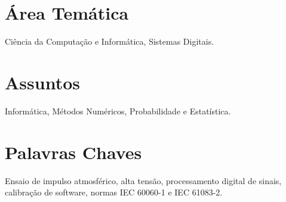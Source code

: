 \section*{Área Temática}
Ciência da Computação e Informática, Sistemas Digitais.

\section*{Assuntos}
Informática, Métodos Numéricos, Probabilidade e Estatística.

\section*{Palavras Chaves}
Ensaio de impulso atmosférico, alta tensão, processamento digital de sinais, calibração de software, normas IEC 60060-1 e IEC 61083-2.